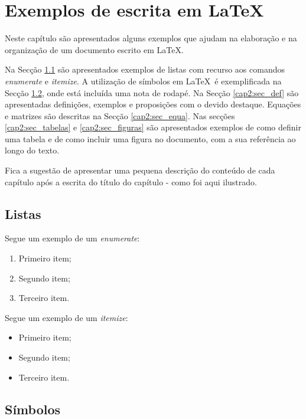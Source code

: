 
\chapter{Exemplos de escrita em \LaTeX}
\label{cap2}

Neste capítulo são apresentados alguns exemplos que ajudam na elaboração e na organização de um documento escrito em \LaTeX. 

Na Secção \ref{cap2:sec_listas} são apresentados exemplos de listas com recurso aos comandos \textit{enumerate} e \textit{itemize}.  A utilização de símbolos em \LaTeX \ é exemplificada na Secção \ref{cap2:sec_simbolos}, onde está incluída uma nota de rodapé. Na Secção \ref{cap2:sec_def} são apresentadas definições, exemplos e proposições com o devido destaque. Equações e matrizes são descritas na Secção \ref{cap2:sec_equa}. Nas secções \ref{cap2:sec_tabelas} e \ref{cap2:sec_figuras} são apresentados exemplos de como definir uma tabela e de como incluir uma figura no documento, com a sua referência ao longo do texto. 

Fica a sugestão de apresentar uma pequena descrição do conteúdo de cada capítulo após a escrita do título do capítulo - como foi aqui ilustrado.

\section{Listas}\label{cap2:sec_listas}

    Segue um exemplo de um \textit{enumerate}:
    \begin{enumerate}
    	\item Primeiro item;
    	\item Segundo item;
    	\item Terceiro item.	
    \end{enumerate}
    
    Segue um exemplo de um \textit{itemize}:   
    \begin{itemize}
    	\item Primeiro item;
    	\item Segundo item;
    	\item Terceiro item.
    \end{itemize}
    
\section{Símbolos}\label{cap2:sec_simbolos}


